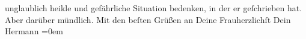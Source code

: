 \begin{ledgroupsized}[t]{13cm}
               unglaublich heikle und gefährliche Situation bedenken, in der er geſchrieben hat.
               Aber darüber mündlich.\pend
           \pstart
           Mit den beſten Grüßen an Deine Frauherzlichſt Dein{\\[\baselineskip]}\spacefill\mbox{Hermann}\pend
           \leftskip=0em{}          \endnumbering{}\end{ledgroupsized}  \newcommand{\dateiname}{L01337}\newcommand{\titel}{Hermann Bahr an Arthur Schnitzler, 9. 11. 1903}\newcommand{\editorInnen}{ Kurt Ifkovits,  Martin Anton Müller}
            \footnotesize
\begin{ledgroupsized}[t]{11.5cm}
\end{ledgroupsized}
         
      